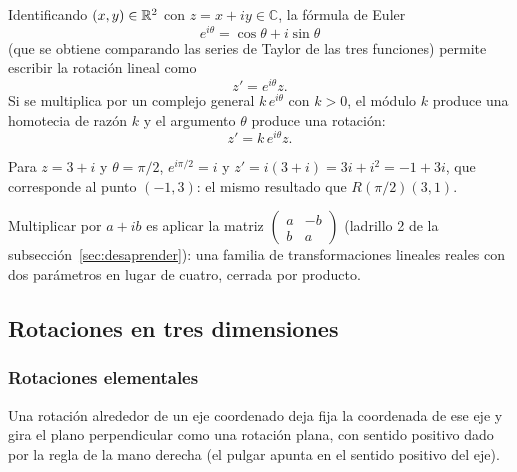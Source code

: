 Identificando \((x,y)\in\mathbb{R}^2\) con \(z=x+iy\in\mathbb C\), la fórmula de Euler
\[
  e^{i\theta}=\cos\theta+i\sin\theta
\]
(que se obtiene comparando las series de Taylor de las tres funciones) permite escribir la
rotación lineal como
\[
  z'=e^{i\theta}z.
\]
Si se multiplica por un complejo general \(k\,e^{i\theta}\) con \(k>0\), el módulo \(k\)
produce una homotecia de razón \(k\) y el argumento \(\theta\) produce una rotación:
\[
  z'=k\,e^{i\theta}z.
\]

\begin{ejemplo}
Para \(z=3+i\) y \(\theta=\pi/2\), \(e^{i\pi/2}=i\) y \(z'=i(3+i)=3i+i^2=-1+3i\), que
corresponde al punto \((-1,3)\): el mismo resultado que \(R(\pi/2)(3,1)\).
\end{ejemplo}

\begin{idea}
Multiplicar por \(a+ib\) es aplicar la matriz
\(\left(\begin{smallmatrix}a&-b\\b&a\end{smallmatrix}\right)\) (ladrillo 2 de la
subsección~\ref{sec:desaprender}): una familia de transformaciones lineales reales con dos
parámetros en lugar de cuatro, cerrada por producto.
\end{idea}

\subsection{Rotaciones en tres dimensiones}\label{sec:rot-3d}


\subsubsection{Rotaciones elementales}

Una rotación alrededor de un eje coordenado deja fija la coordenada de ese eje y gira el
plano perpendicular como una rotación plana, con sentido positivo dado por la regla de la mano
derecha (el pulgar apunta en el sentido positivo del eje).

